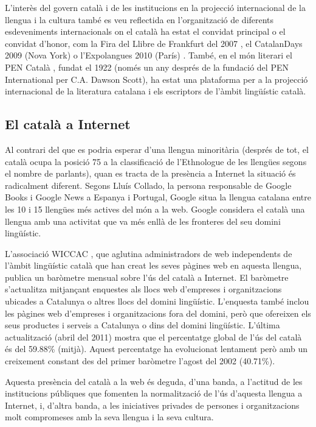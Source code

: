 \documentclass[]{../../metanetpaper}
\begin{document}
\begin{multicols}{2}
L’interès del govern català i de les institucions en la projecció internacional de la llengua i la cultura també es veu reflectida en l’organització de diferents esdeveniments internacionals on el català ha estat el convidat principal o el convidat d’honor, com la Fira del Llibre de Frankfurt del 2007 \cite{CAT-Nota13}, el CatalanDays 2009 (Nova York) \cite{CAT-Nota14} o l’Expolangues 2010 (París) \cite{CAT-Nota15}. També, en el món literari el PEN Català \cite{CAT-Nota16}, fundat el 1922 (només un any després de la fundació del PEN International per C.A. Dawson Scott), ha estat una plataforma per a la projecció internacional de la literatura catalana i els escriptors de l’àmbit lingüístic català.

\subsection{El català a Internet}

 Al contrari del que es podria esperar d’una llengua minoritària (després de tot, el català ocupa la posició 75 a la classificació de l’Ethnologue \cite{CAT-Nota17} de les llengües segons el nombre de parlants), quan es tracta de la presència a Internet la situació és radicalment diferent. Segons Lluís Collado, la persona responsable de Google Books i Google News a Espanya i Portugal, Google situa la llengua catalana entre les 10 i 15 llengües més actives del món a la web. Google considera el català una llengua amb una activitat que va més enllà de les fronteres del seu domini lingüístic.  

L’associació WICCAC \cite{CAT-Nota18}, que aglutina administradors de web independents de l’àmbit lingüístic català que han creat les seves pàgines web en aquesta llengua, publica un baròmetre mensual sobre l’ús del català a Internet. El baròmetre s’actualitza mitjançant enquestes als llocs web d’empreses i organitzacions ubicades a Catalunya o altres llocs del domini lingüístic. L’enquesta també inclou les pàgines web d’empreses i organitzacions fora del domini, però que ofereixen els seus productes i serveis a Catalunya o dins del domini lingüístic. L’última actualització (abril del 2011) mostra que el percentatge global de l’ús del català és del 59.88\% (mitjà). Aquest percentatge ha evolucionat lentament però amb un creixement constant des del primer baròmetre l’agost del 2002 (40.71\%).

Aquesta presència del català a la web és deguda, d’una banda, a l’actitud de les institucions públiques que fomenten la normalització de l’ús d’aquesta llengua a Internet, i, d’altra banda, a les iniciatives privades de persones i organitzacions molt compromeses amb la seva llengua i la seva cultura.


\end{multicols}
\end{document}
